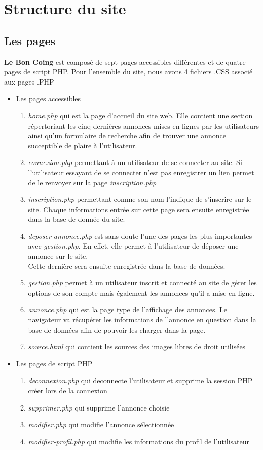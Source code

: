 \documentclass[11pt,a4paper]{article}
\begin{document}
\section{Structure du site}
\subsection{Les pages}
\textbf{Le Bon Coing} est composé de sept pages accessibles différentes et de quatre pages de script PHP. Pour l'ensemble du site, nous avons 4 fichiers .CSS associé aux pages .PHP
\begin{itemize}
    \item Les pages accessibles
    \begin{enumerate}
        \item \emph{home.php} qui est la page d'accueil du site web. Elle contient une section répertoriant les cinq dernières annonces mises en lignes par les utilisateurs ainsi qu'un formulaire de recherche afin de trouver une annonce succeptible de plaire à l'utilisateur.
        \item \emph{connexion.php} permettant à un utilisateur de se connecter au site. Si l'utilisateur essayant de se connecter n'est pas enregistrer un lien permet de le renvoyer sur la page \emph{inscription.php}
        \item \emph{inscription.php} permettant comme son nom l'indique de s'inscrire sur le site. Chaque informations entrée sur cette page sera ensuite enregistrée dans la base de donnée du site.
        \item \emph{deposer-annonce.php} est sans doute l'une des pages les plus importantes avec \emph{gestion.php}. En effet, elle permet à l'utilisateur de déposer une annonce sur le site.\\ Cette dernière sera ensuite enregistrée dans la base de données.
        \item \emph{gestion.php} permet à un utilisateur inscrit et connecté au site de gérer les options de son compte mais également les annonces qu'il a mise en ligne.
        \item \emph{annonce.php} qui est la page type de l'affichage des annonces. Le navigateur va récupérer les informations de l'annonce en question dans la base de données afin de pouvoir les charger dans la page.
        \item \emph{source.html} qui contient les sources des images libres de droit utilisées
    \end{enumerate}
    \newpage
    \item Les pages de script PHP
    \begin{enumerate}
        \item \emph{deconnexion.php} qui deconnecte l'utilisateur et supprime la session PHP créer lors de la connexion
        \item \emph{supprimer.php} qui supprime l'annonce choisie
        \item \emph{modifier.php} qui modifie l'annonce sélectionnée
        \item \emph{modifier-profil.php} qui modifie les informations du profil de l'utilisateur
    \end{enumerate}
\end{itemize}
\end{document}
